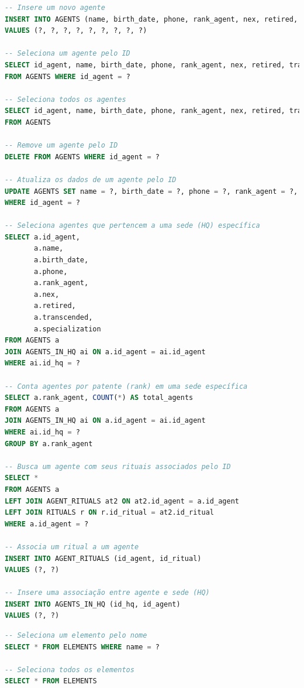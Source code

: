 \documentclass[12pt,a4paper]{report}
\begin{document}
\begin{lstlisting}[language=SQL, caption=Consultas feitas em AgentDAO]
-- Insere um novo agente
INSERT INTO AGENTS (name, birth_date, phone, rank_agent, nex, retired, transcended, specialization, id_agent) 
VALUES (?, ?, ?, ?, ?, ?, ?, ?, ?)

-- Seleciona um agente pelo ID
SELECT id_agent, name, birth_date, phone, rank_agent, nex, retired, transcended, specialization 
FROM AGENTS WHERE id_agent = ?

-- Seleciona todos os agentes
SELECT id_agent, name, birth_date, phone, rank_agent, nex, retired, transcended, specialization 
FROM AGENTS

-- Remove um agente pelo ID
DELETE FROM AGENTS WHERE id_agent = ?

-- Atualiza os dados de um agente pelo ID
UPDATE AGENTS SET name = ?, birth_date = ?, phone = ?, rank_agent = ?, nex = ?, retired = ?, transcended = ?, specialization = ? 
WHERE id_agent = ?

-- Seleciona agentes que pertencem a uma sede (HQ) específica
SELECT a.id_agent,
       a.name,
       a.birth_date,
       a.phone,
       a.rank_agent,
       a.nex,
       a.retired,
       a.transcended,
       a.specialization
FROM AGENTS a
JOIN AGENTS_IN_HQ ai ON a.id_agent = ai.id_agent
WHERE ai.id_hq = ?

-- Conta agentes por patente (rank) em uma sede específica
SELECT a.rank_agent, COUNT(*) AS total_agents
FROM AGENTS a
JOIN AGENTS_IN_HQ ai ON a.id_agent = ai.id_agent
WHERE ai.id_hq = ?
GROUP BY a.rank_agent

-- Busca um agente com seus rituais associados pelo ID
SELECT *
FROM AGENTS a
LEFT JOIN AGENT_RITUALS at2 ON at2.id_agent = a.id_agent
LEFT JOIN RITUALS r ON r.id_ritual = at2.id_ritual
WHERE a.id_agent = ?

-- Associa um ritual a um agente
INSERT INTO AGENT_RITUALS (id_agent, id_ritual) 
VALUES (?, ?)

-- Insere uma associação entre agente e sede (HQ)
INSERT INTO AGENTS_IN_HQ (id_hq, id_agent) 
VALUES (?, ?)
\end{lstlisting}

\begin{lstlisting}[language=SQL, caption=Consultas feitas em ElementDAO]
-- Seleciona um elemento pelo nome
SELECT * FROM ELEMENTS WHERE name = ?

-- Seleciona todos os elementos
SELECT * FROM ELEMENTS
\end{lstlisting}
\end{document}
